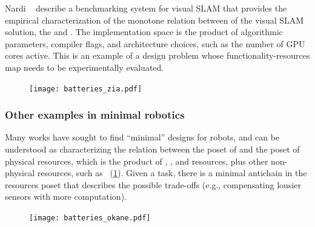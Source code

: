 \begin{example}
Nardi\,\,\etal~\cite{zia16comparative} describe a benchmarking
system for visual SLAM that provides the empirical characterization
of the monotone relation between  of the visual
SLAM solution, the  and . The implementation space is the product
of algorithmic parameters, compiler flags, and architecture choices,
such as the number of GPU cores active. This is an example of a design
problem whose functionality-resources map needs to be experimentally
evaluated.
\end{example}

\begin{figure}[h]
    \centering
    \texttt{[image: batteries\_zia.pdf]}
    \caption{}
\end{figure}


\subsubsection{Other examples in minimal robotics}

Many works have sought to find ``minimal'' designs for robots, and
can be understood as characterizing the relation between the poset
of  and the poset of physical resources, which is the product
of , , and  resources,
plus other non-physical resources, such as ~(\cref{fig:robot-generic}).
Given a task, there is a minimal antichain in the resources poset
that describes the possible trade-offs (e.g., compensating lousier
sensors with more computation). 

\begin{figure}
    \centering
    \texttt{[image: batteries\_okane.pdf]}
    \caption{\label{fig:robot-generic}}
\end{figure}


